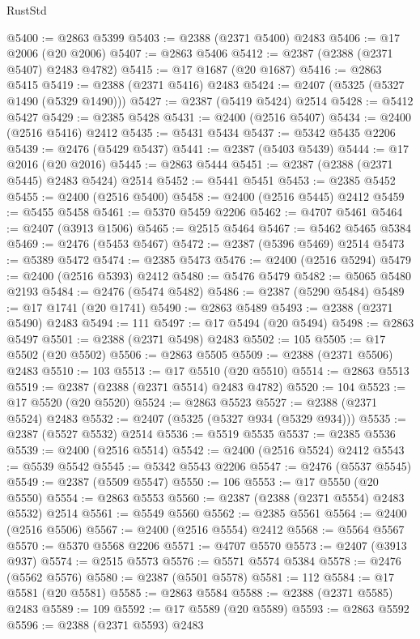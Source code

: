 \begin{lexlean}{RustStd}
\begin{coremodule}
@5400 := @2863 @5399
@5403 := @2388 (@2371 @5400) @2483
@5406 := @17 @2006 (@20 @2006)
@5407 := @2863 @5406
@5412 := @2387 (@2388 (@2371 @5407) @2483 @4782)
@5415 := @17 @1687 (@20 @1687)
@5416 := @2863 @5415
@5419 := @2388 (@2371 @5416) @2483
@5424 := @2407 (@5325 (@5327 @1490 (@5329 @1490)))
@5427 := @2387 (@5419 @5424) @2514
@5428 := @5412 @5427
@5429 := @2385 @5428
@5431 := @2400 (@2516 @5407)
@5434 := @2400 (@2516 @5416) @2412
@5435 := @5431 @5434
@5437 := @5342 @5435 @2206
@5439 := @2476 (@5429 @5437)
@5441 := @2387 (@5403 @5439)
@5444 := @17 @2016 (@20 @2016)
@5445 := @2863 @5444
@5451 := @2387 (@2388 (@2371 @5445) @2483 @5424) @2514
@5452 := @5441 @5451
@5453 := @2385 @5452
@5455 := @2400 (@2516 @5400)
@5458 := @2400 (@2516 @5445) @2412
@5459 := @5455 @5458
@5461 := @5370 @5459 @2206
@5462 := @4707 @5461
@5464 := @2407 (@3913 @1506)
@5465 := @2515 @5464
@5467 := @5462 @5465 @5384
@5469 := @2476 (@5453 @5467)
@5472 := @2387 (@5396 @5469) @2514
@5473 := @5389 @5472
@5474 := @2385 @5473
@5476 := @2400 (@2516 @5294)
@5479 := @2400 (@2516 @5393) @2412
@5480 := @5476 @5479
@5482 := @5065 @5480 @2193
@5484 := @2476 (@5474 @5482)
@5486 := @2387 (@5290 @5484)
@5489 := @17 @1741 (@20 @1741)
@5490 := @2863 @5489
@5493 := @2388 (@2371 @5490) @2483
@5494 := 111
@5497 := @17 @5494 (@20 @5494)
@5498 := @2863 @5497
@5501 := @2388 (@2371 @5498) @2483
@5502 := 105
@5505 := @17 @5502 (@20 @5502)
@5506 := @2863 @5505
@5509 := @2388 (@2371 @5506) @2483
@5510 := 103
@5513 := @17 @5510 (@20 @5510)
@5514 := @2863 @5513
@5519 := @2387 (@2388 (@2371 @5514) @2483 @4782)
@5520 := 104
@5523 := @17 @5520 (@20 @5520)
@5524 := @2863 @5523
@5527 := @2388 (@2371 @5524) @2483
@5532 := @2407 (@5325 (@5327 @934 (@5329 @934)))
@5535 := @2387 (@5527 @5532) @2514
@5536 := @5519 @5535
@5537 := @2385 @5536
@5539 := @2400 (@2516 @5514)
@5542 := @2400 (@2516 @5524) @2412
@5543 := @5539 @5542
@5545 := @5342 @5543 @2206
@5547 := @2476 (@5537 @5545)
@5549 := @2387 (@5509 @5547)
@5550 := 106
@5553 := @17 @5550 (@20 @5550)
@5554 := @2863 @5553
@5560 := @2387 (@2388 (@2371 @5554) @2483 @5532) @2514
@5561 := @5549 @5560
@5562 := @2385 @5561
@5564 := @2400 (@2516 @5506)
@5567 := @2400 (@2516 @5554) @2412
@5568 := @5564 @5567
@5570 := @5370 @5568 @2206
@5571 := @4707 @5570
@5573 := @2407 (@3913 @937)
@5574 := @2515 @5573
@5576 := @5571 @5574 @5384
@5578 := @2476 (@5562 @5576)
@5580 := @2387 (@5501 @5578)
@5581 := 112
@5584 := @17 @5581 (@20 @5581)
@5585 := @2863 @5584
@5588 := @2388 (@2371 @5585) @2483
@5589 := 109
@5592 := @17 @5589 (@20 @5589)
@5593 := @2863 @5592
@5596 := @2388 (@2371 @5593) @2483

\end{coremodule}
\end{lexlean}
